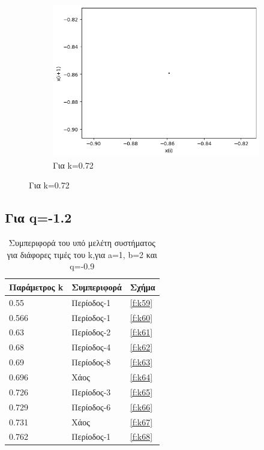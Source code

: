\begin{figure}[h!]
\begin{subfigure}[b]{0.25\textwidth}
		\includegraphics[width=\textwidth]{LateX images/graphs q09/g12}
		\caption{Για k=0.72}
		\label{f:k58}
	\end{subfigure}
	\hfill
	
\end{figure}

\clearpage

\subsection{Για q=-1.2}

\begin{table}[h!]
	\centering
	\begin{tabular}{l | l | l}
		Παράμετρος k & Συμπεριφορά & Σχήμα\\
		\hline
		0.55 &  Περίοδος-1 & \ref{f:k59}\\
		0.566 &  Περίοδος-1 & \ref{f:k60}\\
		0.63& Περίοδος-2 & \ref{f:k61}\\
		0.68& Περίοδος-4 & \ref{f:k62}\\
		0.69 &  Περίοδος-8 & \ref{f:k63}\\
		0.696& Χάος & \ref{f:k64}\\
		0.726& Περίοδος-3 & \ref{f:k65}\\
		0.729& Περίοδος-6 & \ref{f:k66}\\
		0.731& Χάος & \ref{f:k67}\\
		0.762 &  Περίοδος-1 & \ref{f:k68}\\
	\end{tabular}
	\caption{ Συμπεριφορά του υπό μελέτη συστήματος για διάφορες τιμές του k,για a=1, b=2 και q=-0.9}
	\label{tab:abc5}
\end{table}

